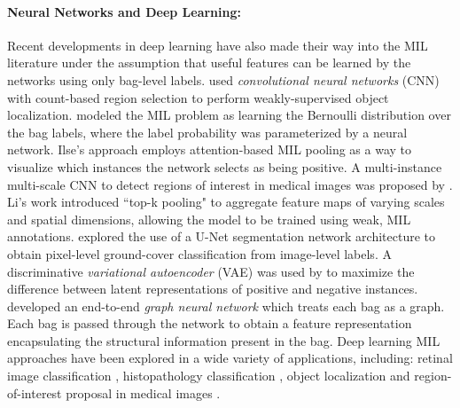\paragraph{Neural Networks and Deep Learning:} 
Recent developments in deep learning have also made their way into the MIL literature under the assumption that useful features can be learned by the networks using only bag-level labels.  \cite{Gao2017CountGuidedWeaklySupervisedLocalization} used \textit{convolutional neural networks} (CNN) with count-based region selection to perform weakly-supervised object localization.  \cite{Ilse2018AttentionBasedDeepMIL} modeled the MIL problem as learning the Bernoulli distribution over the bag labels, where the label probability was parameterized by a neural network.  Ilse's approach employs attention-based MIL pooling as a way to visualize which instances the network selects as being positive.  A multi-instance multi-scale CNN to detect regions of interest in medical images was proposed by \cite{Li2019CNNMedicalImageClassification}.  Li's work introduced ``top-k pooling" to aggregate feature maps of varying scales and spatial dimensions, allowing the model to be trained using weak, MIL annotations.  \cite{Wang2020WSDeepLearningRemoteSensing} explored the use of a U-Net segmentation network architecture to obtain pixel-level ground-cover classification from image-level labels.  A discriminative \textit{variational autoencoder} (VAE) was used by \cite{Ghaffarzadegan2018MILVAE} to maximize the difference between latent representations of positive and negative instances.  \cite{Tu2019MILGraphNN} developed an end-to-end \textit{graph neural network} which treats each bag as a graph.  Each bag is passed through the network to obtain a feature representation encapsulating the structural information present in the bag.  Deep learning MIL approaches have been explored in a wide variety of applications, including: retinal image classification \citep{Tu2019MILGraphNN}, histopathology classification \citep{Ilse2018AttentionBasedDeepMIL}, object localization \citep{Gao2017CountGuidedWeaklySupervisedLocalization} and region-of-interest proposal in medical images \citep{Li2019CNNMedicalImageClassification}.


